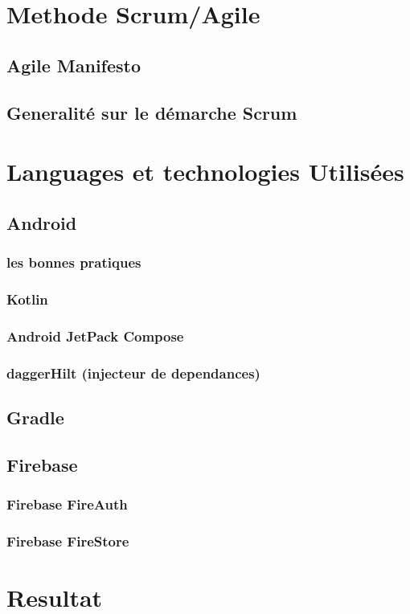 \section{Methode Scrum/Agile}
\lipsum[2-2]
\subsection{Agile Manifesto}
\lipsum[2-2]
\subsection{Generalité sur le démarche Scrum}
\lipsum[2-2]
\section{Languages et technologies Utilisées}
\lipsum[2-2]
\subsection{Android}
\lipsum[2-2]
\subsubsection{les bonnes pratiques}
\lipsum[2-2]
\subsubsection{Kotlin}
\lipsum[2-2]
\subsubsection{Android JetPack Compose}
\lipsum[2-2]
\subsubsection{daggerHilt (injecteur de dependances)}
\lipsum[2-2]
\subsection{Gradle}
\lipsum[2-2]
\subsection{Firebase}
\lipsum[2-2]
\subsubsection{Firebase FireAuth}
\lipsum[2-2]
\subsubsection{Firebase FireStore}
\lipsum[2-2]
\section{Resultat}

%